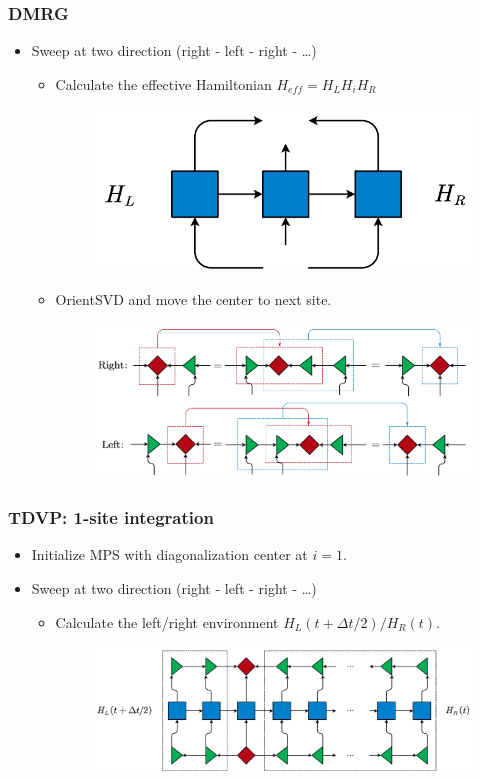 \documentclass{beamer}
\begin{document}
\begin{frame}
	\frametitle{DMRG}
	\begin{itemize}
		\item Sweep at two direction (right - left - right - \dots)
		\begin{itemize}
			\item Calculate the effective Hamiltonian $H_{eff} = H_L H_i H_R$
			\begin{figure}[H]
				\includegraphics[width=0.3 \linewidth]{images/effH1.pdf}
			\end{figure}
			\item OrientSVD and move the center to next site.
			\begin{figure}[H]
				\includegraphics[width=0.6 \linewidth]{images/orientSVD.pdf}
			\end{figure}
		\end{itemize}
	\end{itemize}
\end{frame}


\begin{frame}
	\frametitle{TDVP: 1-site integration}
	\begin{itemize}
		\item Initialize MPS with diagonalization center at $i=1$.
		\newpage
		\item Sweep at two direction (right - left - right - \dots)
		\begin{itemize}
			\item Calculate the left/right environment $H_L(t+\Delta t/2)/H_R(t)$.
			\begin{figure}[H]
				\includegraphics[width=0.8 \linewidth]{images/LRenv1 t.pdf}
			\end{figure}
		\end{itemize}
	\end{itemize}
\end{frame}
\end{document}
